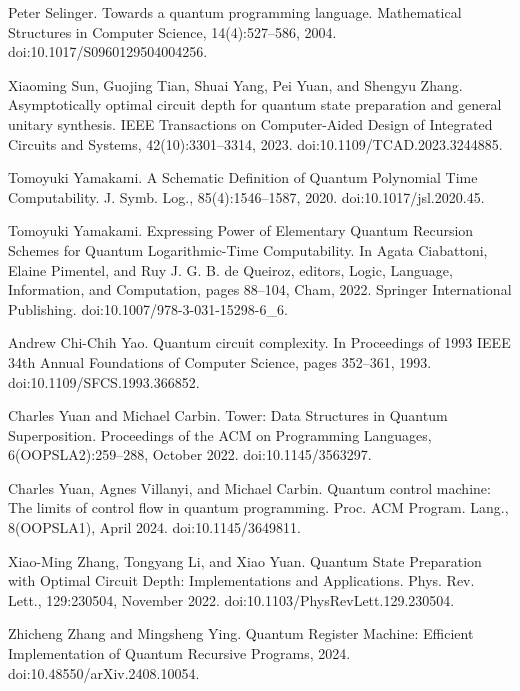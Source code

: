 \par\noindent  [27]  Peter Selinger.  Towards a quantum programming language.  Mathematical Structures in Computer Science, 14(4):527–586, 2004.  doi:10.1017/S0960129504004256.  
 
\par\noindent  [28]  Xiaoming Sun, Guojing Tian, Shuai Yang, Pei Yuan, and Shengyu Zhang.  Asymptotically optimal circuit depth for quantum state preparation and general unitary synthesis.  IEEE Transactions on Computer-Aided Design of Integrated Circuits and Systems, 42(10):3301–3314, 2023.  doi:10.1109/TCAD.2023.3244885.  
 
\par\noindent  [29]  Tomoyuki Yamakami.  A Schematic Definition of Quantum Polynomial Time Computability.  J. Symb. Log., 85(4):1546–1587, 2020.  doi:10.1017/jsl.2020.45.  
 
\par\noindent  [30]  Tomoyuki Yamakami.  Expressing Power of Elementary Quantum Recursion Schemes for Quantum Logarithmic-Time Computability.  In Agata Ciabattoni, Elaine Pimentel, and Ruy J. G. B. de Queiroz, editors, Logic, Language, Information, and Computation, pages 88–104, Cham, 2022. Springer International Publishing.  doi:10.1007/978-3-031-15298-6\_6.  
 
\par\noindent  [31]  Andrew Chi-Chih Yao.  Quantum circuit complexity.  In Proceedings of 1993 IEEE 34th Annual Foundations of Computer Science, pages 352–361, 1993.  doi:10.1109/SFCS.1993.366852.  
 
\par\noindent  [32]  Charles Yuan and Michael Carbin.  Tower: Data Structures in Quantum Superposition.  Proceedings of the ACM on Programming Languages, 6(OOPSLA2):259–288, October 2022.  doi:10.1145/3563297.  
 
\par\noindent  [33]  Charles Yuan, Agnes Villanyi, and Michael Carbin.  Quantum control machine: The limits of control flow in quantum programming.  Proc. ACM Program. Lang., 8(OOPSLA1), April 2024.  doi:10.1145/3649811.  
 
\par\noindent  [34]  Xiao-Ming Zhang, Tongyang Li, and Xiao Yuan.  Quantum State Preparation with Optimal Circuit Depth: Implementations and Applications.  Phys. Rev. Lett., 129:230504, November 2022.  doi:10.1103/PhysRevLett.129.230504.  
 
\par\noindent  [35]  Zhicheng Zhang and Mingsheng Ying.  Quantum Register Machine: Efficient Implementation of Quantum Recursive Programs, 2024.  doi:10.48550/arXiv.2408.10054.  
  
